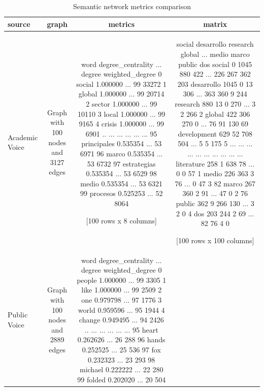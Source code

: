 \begin{table}
\caption{Semantic network metrics comparison}
\label{tab:table5_network_metrics}
\begin{tabular}{lccc}
\toprule
source & graph & metrics & matrix \\
\midrule
Academic Voice & Graph with 100 nodes and 3127 edges &            word  degree_centrality  ...  degree  weighted_degree
0        social           1.000000  ...      99            33272
1        global           1.000000  ...      99            20714
2        sector           1.000000  ...      99            10110
3         local           1.000000  ...      99             9165
4        crisis           1.000000  ...      99             6901
..          ...                ...  ...     ...              ...
95  principales           0.535354  ...      53             6971
96        marco           0.535354  ...      53             6732
97  estrategias           0.535354  ...      53             6529
98        medio           0.535354  ...      53             6321
99     procesos           0.525253  ...      52             8064

[100 rows x 8 columns] &              social  desarrollo  research  global  ...  medio  marco  public  dos
social            0        1045       880     422  ...    226    267     362  203
desarrollo     1045           0        13     306  ...    363    360       9  244
research        880          13         0     270  ...      3      2     266    2
global          422         306       270       0  ...     76     91     130   69
development     629          52       708     504  ...      5      5     175    5
...             ...         ...       ...     ...  ...    ...    ...     ...  ...
literature      258           1       638      78  ...      0      0      57    1
medio           226         363         3      76  ...      0     47       3   82
marco           267         360         2      91  ...     47      0       2   76
public          362           9       266     130  ...      3      2       0    4
dos             203         244         2      69  ...     82     76       4    0

[100 rows x 100 columns] \\
Public Voice & Graph with 100 nodes and 2889 edges &        word  degree_centrality  ...  degree  weighted_degree
0    people           1.000000  ...      99             3305
1      like           1.000000  ...      99             2509
2       one           0.979798  ...      97             1776
3     world           0.959596  ...      95             1944
4    change           0.949495  ...      94             2426
..      ...                ...  ...     ...              ...
95    heart           0.262626  ...      26              288
96    hands           0.252525  ...      25              536
97      fox           0.232323  ...      23              293
98  michael           0.222222  ...      22              280
99   folded           0.202020  ...      20              504


\end{tabular}
\end{table}
